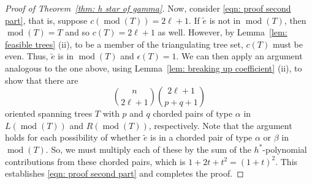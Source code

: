 \documentclass{amsart}
\numberwithin{equation}{section}
\theoremstyle{plain}
\theoremstyle{definition}
\DeclareMathOperator{\md}{mod}
\newcommand{\etilde}{\widetilde{e}}
\begin{document}
\begin{proof}[Proof of Theorem~\ref{thm: h star of gamma}]
    Now, consider \eqref{eqn: proof second part}, that is, suppose $c(\md(T)) = 2\ell+1$.
    If $\widetilde{e}$ is not in $\md(T)$, then $\md(T) = T$ and so $c(T) = 2\ell+1$ as well.
    However, by Lemma~\ref{lem: feasible trees} (ii), to be a member of the triangulating tree set, $c(T)$ must be even.
    Thus, $\widetilde{e}$ is in $\md(T)$ and $\epsilon(T) = 1$.
    We can then apply an argument analogous to the one above, using Lemma~\ref{lem: breaking up coefficient} (ii), to show that there are 
    \[
        \binom{n}{2\ell+1}\binom{2\ell+1}{p+q+1}
    \]
    oriented spanning trees $T$ with $p$ and $q$ chorded pairs of type $\alpha$ in $L(\md(T))$ and $R(\md(T))$, respectively.
    Note that the argument holds for each possibility of whether $\etilde$ is in a chorded pair of type $\alpha$ or $\beta$ in $\md(T)$.
    So, we must multiply each of these by the sum of the $h^*$-polynomial contributions from these chorded pairs, which is $1+2t+t^2 = (1+t)^2$.
    This establishes \eqref{eqn: proof second part} and completes the proof.
%

\end{proof}
\end{document}
